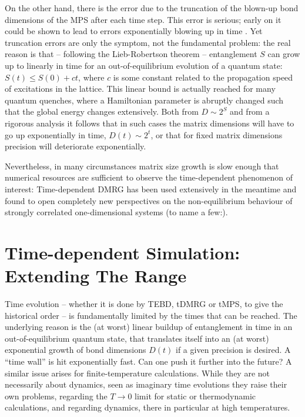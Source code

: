 On the other hand, there is the error due to the truncation of the blown-up bond dimensions of the MPS after each time step. This error is serious; early on it could be shown to lead to errors exponentially blowing up in time \cite{Gobert05}. Yet truncation errors are only the symptom, not the fundamental problem: the real reason is that -- following the Lieb-Robertson theorem -- entanglement $S$ can grow up to linearly in time for an out-of-equilibrium evolution of a quantum state: $S(t) \leq S(0) + c t$, where $c$ is some constant related to the propagation speed of excitations in the lattice\cite{Calabrese06}. This linear bound is actually reached for many quantum quenches, where a Hamiltonian parameter is abruptly changed such that the global energy changes extensively.
Both from $D \sim 2^S$ and from a rigorous analysis \cite{Osborne06} it follows that in such cases the matrix dimensions will have to go up exponentially in time, $D(t) \sim 2^t$, or that for fixed matrix dimensions precision will deteriorate exponentially. 

Nevertheless, in many circumstances matrix size growth is slow enough that numerical resources are sufficient to observe the time-dependent phenomenon of interest: Time-dependent DMRG has been used extensively in the meantime and found to open completely new perspectives on the non-equilibrium behaviour of strongly correlated one-dimensional systems (to name a few:\cite{WhiteFeiguin04,Feiguin05a,Feiguin05,Gobert05,Kollath05,Trebst06,Cramer08,Barthel09a,Kollath06}).
 
\section{Time-dependent Simulation: Extending The Range}
\label{sec:beyondtime}

Time evolution -- whether it is done by TEBD, tDMRG or tMPS, to give the historical order -- is fundamentally limited by the times that can be reached. The underlying reason is the (at worst) linear buildup of entanglement in time in an out-of-equilibrium quantum state, that translates itself into an (at worst) exponential growth of bond dimensions $D(t)$ if a given precision is desired. A ``time wall'' is hit exponentially fast. Can one push it further into the future? A similar issue arises for finite-temperature calculations. While they are not necessarily about dynamics, seen as imaginary time evolutions they raise their own problems, regarding the $T\rightarrow 0$ limit for static or thermodynamic calculations, and regarding dynamics, there in particular at high temperatures.

